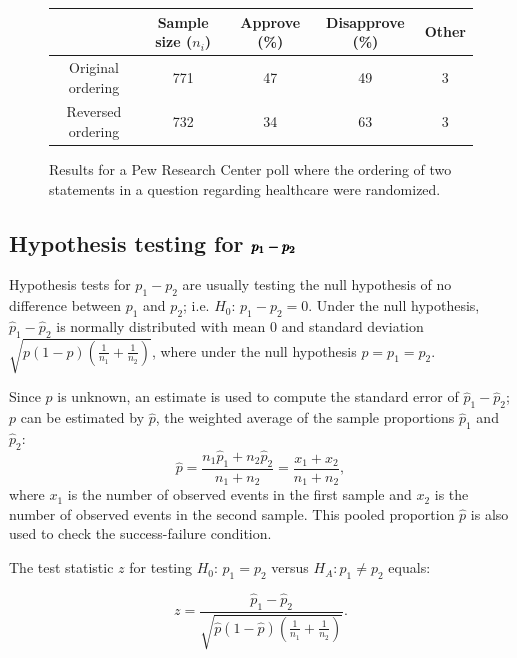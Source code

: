 \begin{figure}[h]
\centering
\begin{tabular}{c c c c c}
	& Sample size ($n_i$) & Approve (\%)	& Disapprove (\%)	& Other \\
\hline
Original ordering & 771	& 47	& 49	& 3 \\
Reversed ordering & 732	& 34	& 63	& 3 \\
\hline
\end{tabular}
\caption{Results for a Pew Research Center poll where the ordering of two statements in a question regarding healthcare were randomized.}
\label{pewPollResultsForRandomizedStatementOrdering}
\end{figure}


\textD{\newpage}


\subsection{Hypothesis testing for $\pmb{\MakeLowercase{p_1 - p_2}}$}


Hypothesis tests for $p_1 - p_2$ are usually testing the null hypothesis of no difference between $p_1$ and $p_2$; i.e. $H_0:\,p_1 - p_2 = 0$. Under the null hypothesis, $\hat{p}_1 - \hat{p}_2$ is normally distributed with mean 0 and standard deviation $\sqrt{p(1-p)(\frac{1}{n_1} + \frac{1}{n_2})}$, where under the null hypothesis $p = p_1 = p_2$.

Since $p$ is unknown, an estimate is used to compute the standard error of $\hat{p}_1 - \hat{p}_2$; $p$ can be estimated by $\hat{p}$, the weighted average of the sample proportions $\hat{p}_1$ and $\hat{p}_2$:
\[\hat{p} = \dfrac{n_{1}\hat{p}_1 + n_{2}\hat{p}_2}{n_{1} + n_{2}} = \dfrac{x_{1} + x_{2}}{n_{1} + n_{2}}, \]
where $x_1$ is the number of observed events in the first sample and $x_2$ is the number of observed events in the second sample. This pooled proportion $\hat{p}$ is also used to check the success-failure condition.

The test statistic $z$ for testing $H_0:\, p_1 = p_2$ versus $H_A: p_1 \neq p_2$ equals:

\[z = \dfrac{\hat{p}_1 - \hat{p}_2}{\sqrt{\hat{p}(1-\hat{p})\left(\frac{1}{n_1} + \frac{1}{n_2} \right)}}. \]
 

